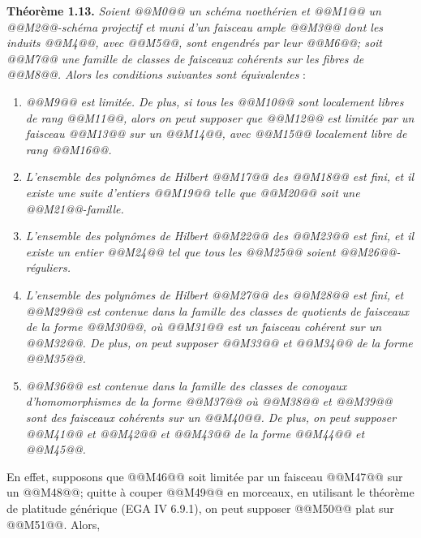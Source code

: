 
\textbf{Théorème 1.13.}
\emph{Soient @@M0@@ un schéma noethérien et @@M1@@ un @@M2@@-schéma projectif et muni d'un faisceau ample @@M3@@ dont les induits @@M4@@, avec @@M5@@, sont engendrés par leur @@M6@@; soit @@M7@@ une famille de classes de faisceaux cohérents sur les fibres de @@M8@@. Alors les conditions suivantes sont équivalentes} :
\begin{enumerate}[label=(\roman*)]
\item \emph{@@M9@@ est limitée. De plus, si tous les @@M10@@ sont localement libres de rang @@M11@@, alors on peut supposer que @@M12@@ est limitée par un faisceau @@M13@@ sur un @@M14@@, avec @@M15@@ localement libre de rang @@M16@@.}
\item \emph{L'ensemble des polynômes de Hilbert @@M17@@ des @@M18@@ est fini, et il existe une suite d'entiers @@M19@@ telle que @@M20@@ soit une @@M21@@-famille.}
\item \emph{L'ensemble des polynômes de Hilbert @@M22@@ des @@M23@@ est fini, et il existe un entier @@M24@@ tel que tous les @@M25@@ soient @@M26@@-réguliers.}
\item \emph{L'ensemble des polynômes de Hilbert @@M27@@ des @@M28@@ est fini, et @@M29@@ est contenue dans la famille des classes de quotients de faisceaux de la forme @@M30@@, où @@M31@@ est un faisceau cohérent sur un @@M32@@. De plus, on peut supposer @@M33@@ et @@M34@@ de la forme @@M35@@.}
\item \emph{@@M36@@ est contenue dans la famille des classes de conoyaux d'homomorphismes de la forme @@M37@@ où @@M38@@ et @@M39@@ sont des faisceaux cohérents sur un @@M40@@. De plus, on peut supposer @@M41@@ et @@M42@@ et @@M43@@ de la forme @@M44@@ et @@M45@@.}
\end{enumerate}
En effet, supposons que @@M46@@ soit limitée par un faisceau @@M47@@ sur un @@M48@@; quitte à couper @@M49@@ en morceaux, en utilisant le théorème de platitude générique (EGA IV 6.9.1), on peut supposer @@M50@@ plat sur @@M51@@. Alors,
